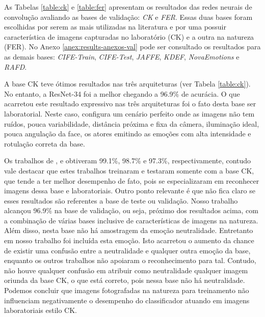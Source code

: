 As Tabelas \ref{table:ck} e \ref{table:fer} apresentam os resultados das redes neurais de convolução avaliando as bases de validação: \textit{CK} e \textit{FER}. Essas duas bases foram escolhidas por serem as mais utilizadas na literatura e por uma possuir característica de imagens capturadas no laboratório (CK) e a outra na natureza (FER). No Anexo \ref{anex:results-anexos-val} pode ser consultado os resultados para as demais bases: \textit{CIFE-Train}, \textit{CIFE-Test}, \textit{JAFFE}, \textit{KDEF}, \textit{NovaEmotions} e \textit{RAFD}. 

A base CK teve ótimos resultados nas três arquiteturas (ver Tabela \ref{table:ck}). No entanto, a ResNet-34 foi a melhor chegando a 96.9\% de acurácia. O que acarretou este resultado expressivo nas três arquiteturas foi o fato desta base ser laboratorial. Neste caso, configura um cenário perfeito onde as imagens não tem ruídos, pouca variabilidade, distância próxima e fixa da câmera, iluminação ideal, pouca angulação da face, os atores emitindo as emoções com alta intensidade e rotulação correta da base. 

Os trabalhos de \cite{art1}, \cite{art11} e \cite{art7} obtiveram  99.1\%, 98.7\% e 97.3\%, respectivamente, contudo vale destacar que estes trabalhos treinaram e testaram somente com a base CK, que tende a ter melhor desempenho de fato, pois se especializaram em reconhecer imagens dessa base e laboratoriais. Outro ponto relevante é que não fica claro se esses resultados são referentes a base de teste ou validação. Nosso trabalho alcançou 96.9\% na base de validação, ou seja, próximo dos resultados acima, com a combinação de várias bases inclusive de características de imagens na natureza. Além disso, nesta base não há amostragem da emoção neutralidade. Entretanto em nosso trabalho foi incluída esta emoção. Isto acarretou o aumento da chance de existir uma confusão entre a neutralidade e qualquer outra emoção da base, enquanto os outros trabalhos não apoiaram o reconhecimento para tal. Contudo, não houve qualquer confusão em atribuir como neutralidade qualquer imagem oriunda da base CK, o que está correto, pois nessa base não há neutralidade. Podemos concluir que imagens fotografadas na natureza para treinamento não influenciam negativamente o desempenho do classificador atuando em imagens laboratoriais estilo CK. 

